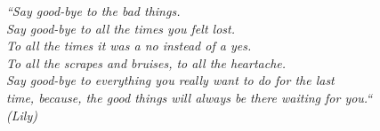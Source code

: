 \begin{epigrafe}
    \vspace*{\fill}
	\begin{flushright}
		\textit{``Say good-bye to the bad things. \\
            Say good-bye to all the times you felt lost. \\
            To all the times it was a no instead of a yes. \\
            To all the scrapes and bruises, to all the heartache. \\
            Say good-bye to everything you really want to do for the last \\
            time, because, the good things will always be there waiting for you.``\\
                (Lily)}
	\end{flushright}
\end{epigrafe}
